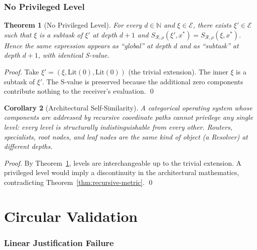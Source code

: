 \documentclass[twocolumn,a4paper]{article}
\newtheorem{theorem}{Theorem}[section]
\newtheorem{corollary}[theorem]{Corollary}
\newcommand{\Natural}{\mathbb{N}}
\newcommand{\Expr}{\mathcal{E}}
\newcommand{\receiver}{\mathcal{R}}
\newcommand{\Sscalar}{S}
\begin{document}
\section{No Privileged Level}
\label{sec:no-priv-level}

\begin{theorem}[No Privileged Level]
\label{thm:no-priv-level}
For every $d\in\Natural$ and $\xi\in\Expr$, there exists $\xi'\in\Expr$ such that $\xi$ is a subtask of $\xi'$ at depth $d+1$ and $\Sscalar_{\receiver,\rho}(\xi',x^{*})=\Sscalar_{\receiver,\rho}(\xi,x^{*})$. Hence the same expression appears as ``global'' at depth $d$ and as ``subtask'' at depth $d+1$, with identical S-value.
\end{theorem}

\begin{proof}
Take $\xi'=(\xi,\mathrm{Lit}(0),\mathrm{Lit}(0))$ (the trivial extension). The inner $\xi$ is a subtask of $\xi'$. The S-value is preserved because the additional zero components contribute nothing to the receiver's evaluation. \qed
\end{proof}

\begin{corollary}[Architectural Self-Similarity]
\label{cor:arch-self-similarity}
A categorical operating system whose components are addressed by recursive coordinate paths cannot privilege any single level: every level is structurally indistinguishable from every other. Routers, specialists, root nodes, and leaf nodes are the same kind of object (a Resolver) at different depths.
\end{corollary}

\begin{proof}
By Theorem~\ref{thm:no-priv-level}, levels are interchangeable up to the trivial extension. A privileged level would imply a discontinuity in the architectural mathematics, contradicting Theorem~\ref{thm:recursive-metric}. \qed
\end{proof}

\part{Circular Validation}

\section{Linear Justification Failure}
\label{sec:linear-failure}
\end{document}
